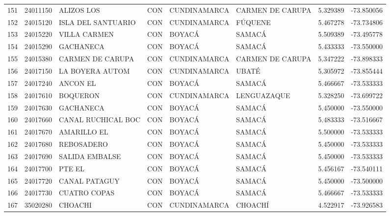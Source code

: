 \documentclass[11pt]{article}
\begin{document}
\begin{table}
\begin{tabular}{lrllllrr}
151 &  24011150 &               ALIZOS LOS  &  CON &  CUNDINAMARCA &  CARMEN DE CARUPA &  5.329389 & -73.850056 \\
152 &  24015120 &        ISLA DEL SANTUARIO &  CON &  CUNDINAMARCA &           FÚQUENE &  5.467278 & -73.734806 \\
153 &  24015220 &           VILLA CARMEN    &  CON &        BOYACÁ &            SAMACÁ &  5.509389 & -73.495778 \\
154 &  24015290 &                 GACHANECA &  CON &        BOYACÁ &            SAMACÁ &  5.433333 & -73.550000 \\
155 &  24015380 &          CARMEN DE CARUPA &  CON &  CUNDINAMARCA &  CARMEN DE CARUPA &  5.347222 & -73.898333 \\
156 &  24017150 &           LA BOYERA AUTOM &  CON &  CUNDINAMARCA &             UBATÉ &  5.305972 & -73.855444 \\
157 &  24017240 &                 ANCON EL  &  CON &        BOYACÁ &            SAMACÁ &  5.466667 & -73.533333 \\
158 &  24017610 &              BOQUERON     &  CON &  CUNDINAMARCA &       LENGUAZAQUE &  5.328250 & -73.699722 \\
159 &  24017630 &                GACHANECA  &  CON &        BOYACÁ &            SAMACÁ &  5.450000 & -73.550000 \\
160 &  24017660 &        CANAL RUCHICAL BOC &  CON &        BOYACÁ &            SAMACÁ &  5.483333 & -73.516667 \\
161 &  24017670 &              AMARILLO EL  &  CON &        BOYACÁ &            SAMACÁ &  5.500000 & -73.533333 \\
162 &  24017680 &               REBOSADERO  &  CON &        BOYACÁ &            SAMACÁ &  5.450000 & -73.533333 \\
163 &  24017690 &            SALIDA EMBALSE &  CON &        BOYACÁ &            SAMACÁ &  5.450000 & -73.533333 \\
164 &  24017700 &                   PTE EL  &  CON &        BOYACÁ &            SAMACÁ &  5.456167 & -73.540111 \\
165 &  24017720 &             CANAL PATAGUY &  CON &        BOYACÁ &            SAMACÁ &  5.450000 & -73.500000 \\
166 &  24017730 &              CUATRO COPAS &  CON &        BOYACÁ &            SAMACÁ &  5.466667 & -73.533333 \\
167 &  35020280 &                  CHOACHI  &  CON &  CUNDINAMARCA &           CHOACHÍ &  4.522917 & -73.926583 \\

\end{tabular}
\end{table}
\end{document}
